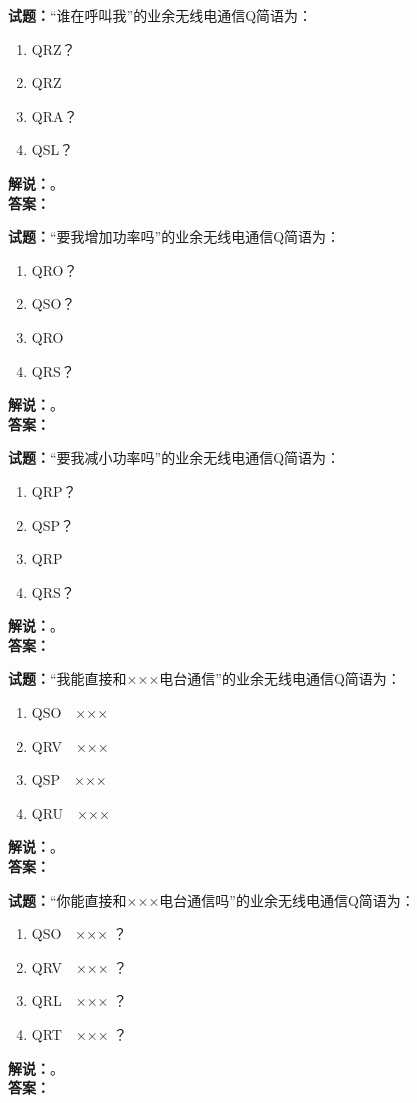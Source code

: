 \documentclass{ctexbook}
\begin{document}
\bigskip

\noindent\textbf{试题：}“谁在呼叫我”的业余无线电通信Q简语为：
\begin{enumerate}[leftmargin=3em]
  \item QRZ？
  \item QRZ
  \item QRA？
  \item QSL？
\end{enumerate}
\noindent\textbf{解说：}\textbf{}。\\\noindent\textbf{答案：}

\bigskip

\noindent\textbf{试题：}“要我增加功率吗”的业余无线电通信Q简语为：
\begin{enumerate}[leftmargin=3em]
  \item QRO？
  \item QSO？
  \item QRO
  \item QRS？
\end{enumerate}
\noindent\textbf{解说：}\textbf{}。\\\noindent\textbf{答案：}

\bigskip

\noindent\textbf{试题：}“要我减小功率吗”的业余无线电通信Q简语为：
\begin{enumerate}[leftmargin=3em]
  \item QRP？
  \item QSP？
  \item QRP
  \item QRS？
\end{enumerate}
\noindent\textbf{解说：}\textbf{}。\\\noindent\textbf{答案：}

\bigskip

\noindent\textbf{试题：}“我能直接和×××电台通信”的业余无线电通信Q简语为：
\begin{enumerate}[leftmargin=3em]
  \item QSO　×××
  \item QRV　×××
  \item QSP　×××
  \item QRU　×××
\end{enumerate}
\noindent\textbf{解说：}\textbf{}。\\\noindent\textbf{答案：}

\bigskip

\noindent\textbf{试题：}“你能直接和×××电台通信吗”的业余无线电通信Q简语为：
\begin{enumerate}[leftmargin=3em]
  \item QSO　××× ？
  \item QRV　××× ？
  \item QRL　××× ？
  \item QRT　××× ？
\end{enumerate}
\noindent\textbf{解说：}\textbf{}。\\\noindent\textbf{答案：}
\end{document}
